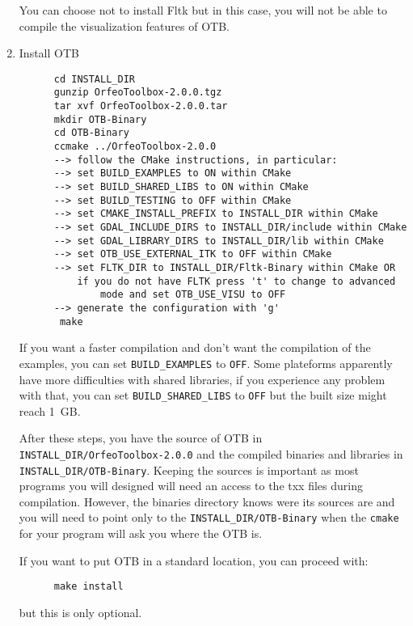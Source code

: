 \begin{enumerate}
   You can choose not to install Fltk but in this case, you will not be able to
   compile the visualization features of OTB.

\item Install OTB
  \begin{verbatim}
      cd INSTALL_DIR
      gunzip OrfeoToolbox-2.0.0.tgz
      tar xvf OrfeoToolbox-2.0.0.tar
      mkdir OTB-Binary
      cd OTB-Binary
      ccmake ../OrfeoToolbox-2.0.0
      --> follow the CMake instructions, in particular:
	  --> set BUILD_EXAMPLES to ON within CMake
	  --> set BUILD_SHARED_LIBS to ON within CMake
	  --> set BUILD_TESTING to OFF within CMake
	  --> set CMAKE_INSTALL_PREFIX to INSTALL_DIR within CMake
	  --> set GDAL_INCLUDE_DIRS to INSTALL_DIR/include within CMake
	  --> set GDAL_LIBRARY_DIRS to INSTALL_DIR/lib within CMake
	  --> set OTB_USE_EXTERNAL_ITK to OFF within CMake
	  --> set FLTK_DIR to INSTALL_DIR/Fltk-Binary within CMake OR
	      if you do not have FLTK press 't' to change to advanced
              mode and set OTB_USE_VISU to OFF 
	  --> generate the configuration with 'g'
       make
  \end{verbatim}
  
  If you want a faster compilation and don't want the compilation of the examples, you
  can set \texttt{BUILD\_EXAMPLES} to \texttt{OFF}. Some plateforms apparently 
  have more difficulties with shared libraries, if you experience any problem 
  with that, you can set \texttt{BUILD\_SHARED\_LIBS} to \texttt{OFF} but the 
  built size might reach 1~GB.
      
  After these steps, you have the source of OTB in \texttt{INSTALL\_DIR/OrfeoToolbox-2.0.0}
  and the compiled binaries and libraries in \texttt{INSTALL\_DIR/OTB-Binary}. Keeping
  the sources is important as most programs you will designed will need an access 
  to the txx files during compilation. However, the binaries directory knows were
  its sources are and you will need to point only to the \texttt{INSTALL\_DIR/OTB-Binary}
  when the \texttt{cmake} for your program will ask you where the OTB is. 

  If you want to put OTB in a standard location, you can proceed with:
      
  \begin{verbatim}
      make install
  \end{verbatim}
  
  but this is only optional.
  
    
\end{enumerate}

